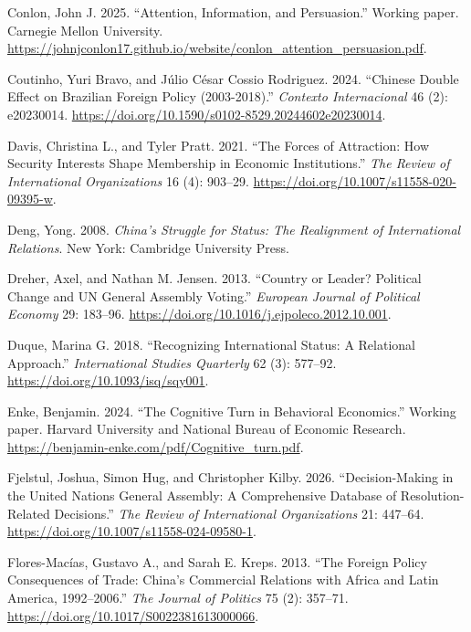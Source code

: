 \documentclass[
  12pt,
]{article}
\newlength{\cslhangindent}
\newenvironment{CSLReferences}[2] %
 {\begin{list}{}{%
  \setlength{\itemindent}{0pt}
  \setlength{\leftmargin}{0pt}
  \setlength{\parsep}{0pt}
  \ifodd #1
   \setlength{\leftmargin}{\cslhangindent}
   \setlength{\itemindent}{-1\cslhangindent}
  \fi
  \setlength{\itemsep}{#2\baselineskip}}}
 {\end{list}}
\begin{document}
\begin{CSLReferences}{1}{0}
Conlon, John J. 2025. {``Attention, {Information}, and {Persuasion}.''} Working paper. Carnegie Mellon University. \url{https://johnjconlon17.github.io/website/conlon_attention_persuasion.pdf}.

Coutinho, Yuri Bravo, and Júlio César Cossio Rodriguez. 2024. {``Chinese {Double Effect} on {Brazilian Foreign Policy} (2003-2018).''} \emph{Contexto Internacional} 46 (2): e20230014. \url{https://doi.org/10.1590/s0102-8529.20244602e20230014}.

Davis, Christina L., and Tyler Pratt. 2021. {``The Forces of Attraction: How Security Interests Shape Membership in Economic Institutions.''} \emph{The Review of International Organizations} 16 (4): 903--29. \url{https://doi.org/10.1007/s11558-020-09395-w}.

Deng, Yong. 2008. \emph{China's Struggle for Status: The Realignment of International Relations}. New York: Cambridge University Press.

Dreher, Axel, and Nathan M. Jensen. 2013. {``Country or Leader? {Political} Change and {UN General Assembly} Voting.''} \emph{European Journal of Political Economy} 29: 183--96. \url{https://doi.org/10.1016/j.ejpoleco.2012.10.001}.

Duque, Marina G. 2018. {``Recognizing {International Status}: {A Relational Approach}.''} \emph{International Studies Quarterly} 62 (3): 577--92. \url{https://doi.org/10.1093/isq/sqy001}.

Enke, Benjamin. 2024. {``The Cognitive Turn in Behavioral Economics.''} Working paper. {Harvard University and National Bureau of Economic Research}. \url{https://benjamin-enke.com/pdf/Cognitive_turn.pdf}.

Fjelstul, Joshua, Simon Hug, and Christopher Kilby. 2026. {``Decision-Making in the {United Nations General Assembly}: A Comprehensive Database of Resolution-Related Decisions.''} \emph{The Review of International Organizations} 21: 447--64. \url{https://doi.org/10.1007/s11558-024-09580-1}.

Flores-Macías, Gustavo A., and Sarah E. Kreps. 2013. {``The {Foreign Policy Consequences} of {Trade}: {China}'s {Commercial Relations} with {Africa} and {Latin America}, 1992--2006.''} \emph{The Journal of Politics} 75 (2): 357--71. \url{https://doi.org/10.1017/S0022381613000066}.


\end{CSLReferences}
\end{document}

